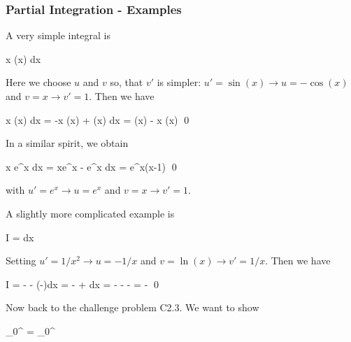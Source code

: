\subsubsection{Partial Integration - Examples}

A very simple integral is

\bee
\int x \sin(x) dx
\eee

Here we choose $u$ and $v$ so, that $v'$ is simpler: $u'=\sin(x) \rightarrow u = -\cos(x)$ and $v=x \rightarrow v'=1$. Then we have

\bee
\int x \sin(x) dx = -x \cos(x) + \int \cos(x) dx = \sin(x) - x \cos(x) \qed
\eee

In a similar spirit, we obtain

\bee
\int x e^x dx = xe^x - \int e^x dx = e^x(x-1) \qed
\eee

with $u'=e^x \rightarrow u=e^x$ and $v=x \rightarrow v'=1$. 

A slightly more complicated example is

\bee
I = \int {}dx
\eee

Setting $u'=1/x^2 \rightarrow u=-1/x$ and $v=\ln(x) \rightarrow v'=1/x$. Then we have

\bee
I = - - \int \left(-\right)dx = - + \int {}dx = - - - = - \qed
\eee

Now back to the challenge problem C2.3. We want to show

\bee
\int_0^\infty {} = \int_0^\infty {}
\eee
